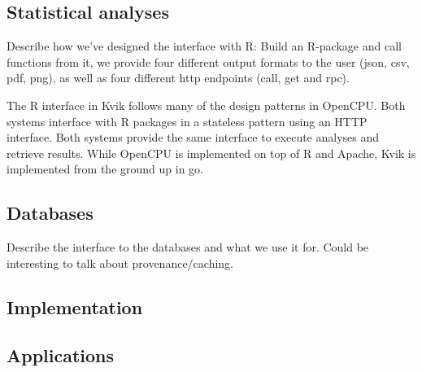 \subsection*{Statistical analyses}
Describe how we've designed the interface with R: Build an R-package and call
functions from it, we provide four different output formats to the user
 (json, csv, pdf, png),  as well as four different http endpoints (call, get and
rpc).

The R interface in Kvik follows many of the design patterns in OpenCPU. Both
systems interface with R packages in a stateless pattern using an HTTP
interface. Both systems provide the same interface to execute analyses and
retrieve results. While OpenCPU is implemented on top of R and Apache, Kvik is
implemented from the ground up in go. 


%
\subsection*{Databases}
Describe the interface to the databases and what we use it for. Could be
interesting to talk about provenance/caching.

\subsection*{Implementation}

\subsection*{Applications}



